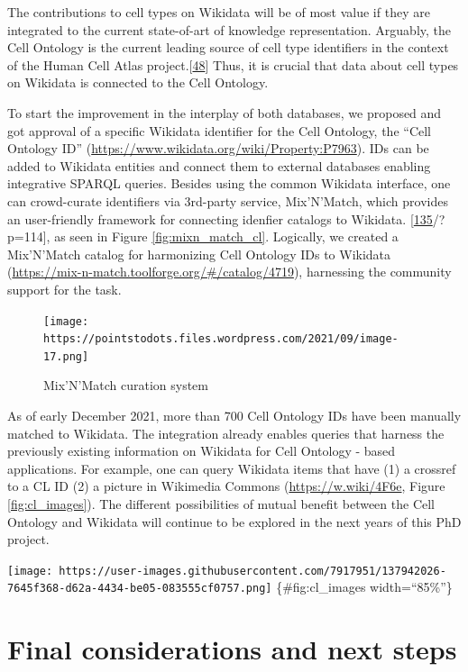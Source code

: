 The contributions to cell types on Wikidata will be of most value if they are integrated to the current state-of-art of knowledge representation.
Arguably, the Cell Ontology is the current leading source of cell type identifiers in the context of the Human Cell Atlas project.{[}\protect\hyperlink{ref-qT8WxqjA}{48}{]}
Thus, it is crucial that data about cell types on Wikidata is connected to the Cell Ontology.

To start the improvement in the interplay of both databases, we proposed and got approval of a specific Wikidata identifier for the Cell Ontology, the ``Cell Ontology ID'' (\url{https://www.wikidata.org/wiki/Property:P7963}).
IDs can be added to Wikidata entities and connect them to external databases enabling integrative SPARQL queries.
Besides using the common Wikidata interface, one can crowd-curate identifiers via 3rd-party service, Mix'N'Match, which provides an user-friendly framework for connecting idenfier catalogs to Wikidata. {[}\protect\hyperlink{ref-JgiKEEdq}{135}/?p=114{]}, as seen in Figure \ref{fig:mixn_match_cl}.
Logically, we created a Mix'N'Match catalog for harmonizing Cell Ontology IDs to Wikidata (\url{https://mix-n-match.toolforge.org/\#/catalog/4719}), harnessing the community support for the task.

\begin{figure}
\hypertarget{fig:mixnmatch_cl}{%
\centering
\texttt{[image: https://pointstodots.files.wordpress.com/2021/09/image-17.png]}
\caption{Mix'N'Match curation system}\label{fig:mixnmatch_cl}
}
\end{figure}

As of early December 2021, more than 700 Cell Ontology IDs have been manually matched to Wikidata.
The integration already enables queries that harness the previously existing information on Wikidata for Cell Ontology - based applications.
For example, one can query Wikidata items that have (1) a crossref to a CL ID (2) a picture in Wikimedia Commons (\url{https://w.wiki/4F6e}, Figure \ref{fig:cl_images}).
The different possibilities of mutual benefit between the Cell Ontology and Wikidata will continue to be explored in the next years of this PhD project.

\texttt{[image: https://user-images.githubusercontent.com/7917951/137942026-7645f368-d62a-4434-be05-083555cf0757.png]} \{\#fig:cl\_images width=``85\%''\}

\hypertarget{final-considerations-and-next-steps}{%
\section{Final considerations and next steps}\label{final-considerations-and-next-steps}}


